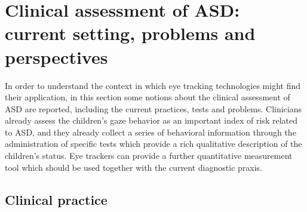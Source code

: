 \section{Clinical assessment of ASD: current setting, problems and perspectives}
\label{sec:clinicalassessment}

In order to understand the context in which eye tracking technologies might find their application, in this section some notions about the clinical assessment of ASD are reported, including the current practices, tests and problems. Clinicians already assess the children’s gaze behavior as an important index of risk related to ASD, and they already collect a series of behavioral information through the administration of specific tests which provide a rich qualitative description of the children’s status. Eye trackers can provide a further quantitative measurement tool which should be used together with the current diagnostic praxis.


\subsection{Clinical practice}
\label{sec:clinicalpraxis}

\newline

